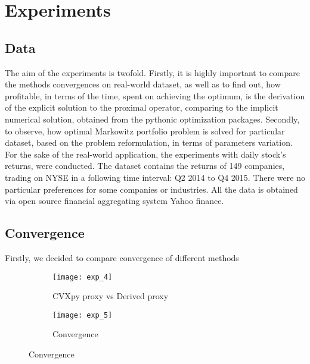 \documentclass[a4paper]{article}
\begin{document}

\section{Experiments}
\subsection{Data}

The aim of the experiments is twofold. Firstly, it is highly important to compare the methods convergences on real-world dataset, as well as to find out, how profitable, in terms of the time, spent on achieving the optimum, is the derivation of the explicit solution to the proximal operator, comparing to the implicit numerical solution, obtained from the pythonic optimization packages. Secondly, to observe, how optimal Markowitz portfolio problem is solved for particular dataset, based on the problem reformulation, in terms of parameters variation.\newline
For the sake of the real-world application, the experiments with daily stock's returns, were conducted. The dataset contains the returns of 149 companies, trading on NYSE in a following time interval: Q2 2014 to Q4 2015. There were no particular preferences for some companies or industries. All the data is obtained via open source financial aggregating system Yahoo finance.


\subsection{Convergence}
Firstly, we decided to compare convergence of different methods
\begin{figure}[!h]
\centering
\begin{subfigure}{.5\textwidth}
  \centering
  \texttt{[image: exp\_4]}
  \caption{\label{fig:proxy}CVXpy proxy vs Derived proxy}
\end{subfigure}%
\begin{subfigure}{.5\textwidth}
  \centering
  \texttt{[image: exp\_5]}
  \caption{\label{fig:conv}Convergence}
\end{subfigure}
\end{figure}
\end{document}

